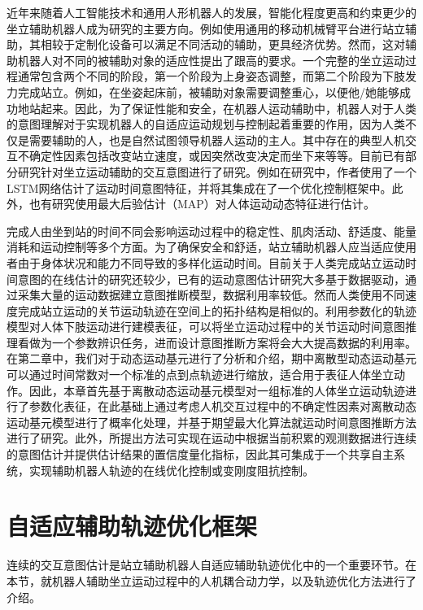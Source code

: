 近年来随着人工智能技术和通用人形机器人的发展，智能化程度更高和约束更少的坐立辅助机器人成为研究的主要方向。例如使用通用的移动机械臂平台进行站立辅助，其相较于定制化设备可以满足不同活动的辅助，更具经济优势\cite{liIntegratedApproachRobotic2021}。然而，这对辅助机器人对不同的被辅助对象的适应性提出了跟高的要求。一个完整的坐立运动过程通常包含两个不同的阶段，第一个阶段为上身姿态调整，而第二个阶段为下肢发力完成站立。例如，在坐姿起床前，被辅助对象需要调整重心，以便他/她能够成功地站起来。因此，为了保证性能和安全，在机器人运动辅助中，机器人对于人类的意图理解对于实现机器人的自适应运动规划与控制起着重要的作用，因为人类不仅是需要辅助的人，也是自然试图领导机器人运动的主人。其中存在的典型人机交互不确定性因素包括改变站立速度，或因突然改变决定而坐下来等等。目前已有部分研究针对坐立运动辅助的交互意图进行了研究。例如在研究\cite{liIntegratedApproachRobotic2021}中，作者使用了一个LSTM网络估计了运动时间意图特征，并将其集成在了一个优化控制框架中。此外，也有研究使用最大后验估计（MAP）对人体运动动态特征进行估计\cite{romanoCoDyCoProjectAchievements2018}。

完成人由坐到站的时间不同会影响运动过程中的稳定性、肌肉活动、舒适度、能量消耗和运动控制等多个方面。为了确保安全和舒适，站立辅助机器人应当适应使用者由于身体状况和能力不同导致的多样化运动时间。目前关于人类完成站立运动时间意图的在线估计的研究还较少，已有的运动意图估计研究大多基于数据驱动，通过采集大量的运动数据建立意图推断模型，数据利用率较低。然而人类使用不同速度完成站立运动的关节运动轨迹在空间上的拓扑结构是相似的。利用参数化的轨迹模型对人体下肢运动进行建模表征，可以将坐立运动过程中的关节运动时间意图推理看做为一个参数辨识任务，进而设计意图推断方案将会大大提高数据的利用率。在第二章中，我们对于动态运动基元进行了分析和介绍，期中离散型动态运动基元可以通过时间常数对一个标准的点到点轨迹进行缩放，适合用于表征人体坐立动作。因此，本章首先基于离散动态运动基元模型对一组标准的人体坐立运动轨迹进行了参数化表征，在此基础上通过考虑人机交互过程中的不确定性因素对离散动态运动基元模型进行了概率化处理，并基于期望最大化算法就运动时间意图推断方法进行了研究。此外，所提出方法可实现在运动中根据当前积累的观测数据进行连续的意图估计并提供估计结果的置信度量化指标，因此其可集成于一个共享自主系统，实现辅助机器人轨迹的在线优化控制或变刚度阻抗控制。
\section{自适应辅助轨迹优化框架}  
连续的交互意图估计是站立辅助机器人自适应辅助轨迹优化中的一个重要环节。在本节，就机器人辅助坐立运动过程中的人机耦合动力学，以及轨迹优化方法进行了介绍。
